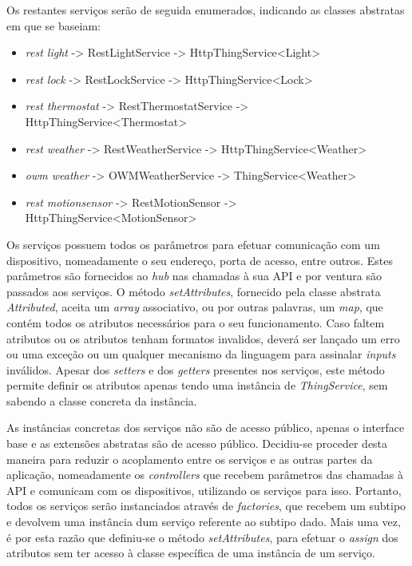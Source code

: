 \newpage

Os restantes serviços serão de seguida enumerados, indicando as classes abstratas em que se baseiam:
\begin{itemize}
    \item \textit{rest light} -> RestLightService -> HttpThingService<Light>
    \item \textit{rest lock} -> RestLockService -> HttpThingService<Lock>
    \item \textit{rest thermostat} -> RestThermostatService -> HttpThingService<Thermostat>
    \item \textit{rest weather} -> RestWeatherService -> HttpThingService<Weather>
    \item \textit{owm weather} -> OWMWeatherService -> ThingService<Weather>
    \item \textit{rest motionsensor} -> RestMotionSensor -> HttpThingService<MotionSensor>
\end{itemize}

Os serviços possuem todos os parâmetros para efetuar comunicação com um dispositivo, nomeadamente o seu endereço, porta de acesso, entre outros. Estes parâmetros são fornecidos ao \textit{hub} nas chamadas à sua API e por ventura são passados aos serviços. O método \textit{setAttributes}, fornecido pela classe abstrata \textit{Attributed}, aceita um \textit{array} associativo, ou por outras palavras, um \textit{map}, que contém todos os atributos necessários para o seu funcionamento. Caso faltem atributos ou os atributos tenham formatos invalidos, deverá ser lançado um erro ou uma exceção ou um qualquer mecanismo da linguagem para assinalar \textit{inputs} inválidos. Apesar dos \textit{setters} e dos \textit{getters} presentes nos serviços, este método permite definir os atributos apenas tendo uma instância de \textit{ThingService}, sem sabendo a classe concreta da instância.

As instâncias concretas dos serviços não são de acesso público, apenas o interface base e as extensões abstratas são de acesso público. Decidiu-se proceder desta maneira para reduzir o acoplamento entre os serviços e as outras partes da aplicação, nomeadamente os \textit{controllers} que recebem parâmetros das chamadas à API e comunicam com os dispositivos, utilizando os serviços para isso. Portanto, todos os serviços serão instanciados através de \textit{factories}, que recebem um subtipo e devolvem uma instância dum serviço referente ao subtipo dado. Mais uma vez, é por esta razão que definiu-se o método \textit{setAttributes}, para efetuar o \textit{assign} dos atributos sem ter acesso à classe específica de uma instância de um serviço.

